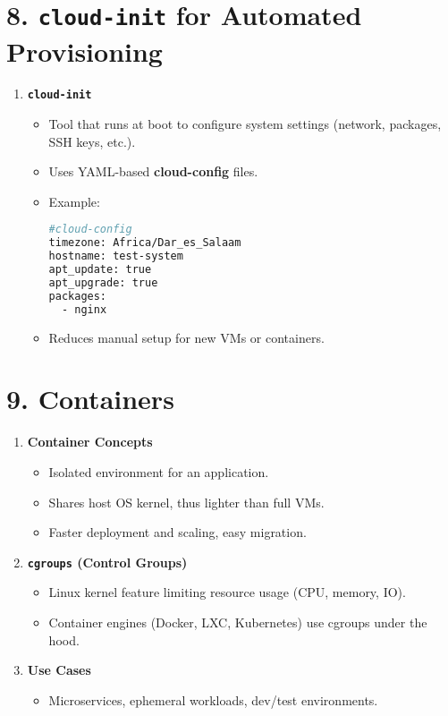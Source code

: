 \documentclass[12pt,a4paper]{report}
\begin{document}
\section*{8. \texttt{cloud-init} for Automated Provisioning}

\begin{enumerate}
    \item \textbf{\texttt{cloud-init}}
    \begin{itemize}
        \item Tool that runs at boot to configure system settings (network, packages, SSH keys, etc.).
        \item Uses YAML-based \textbf{cloud-config} files.
        \item Example:
        \begin{lstlisting}[language=bash]
#cloud-config
timezone: Africa/Dar_es_Salaam
hostname: test-system
apt_update: true
apt_upgrade: true
packages:
  - nginx
        \end{lstlisting}
        \item Reduces manual setup for new VMs or containers.
    \end{itemize}
\end{enumerate}

\section*{9. Containers}

\begin{enumerate}
    \item \textbf{Container Concepts}
    \begin{itemize}
        \item Isolated environment for an application.
        \item Shares host OS kernel, thus lighter than full VMs.
        \item Faster deployment and scaling, easy migration.
    \end{itemize}

    \item \textbf{\texttt{cgroups} (Control Groups)}
    \begin{itemize}
        \item Linux kernel feature limiting resource usage (CPU, memory, IO).
        \item Container engines (Docker, LXC, Kubernetes) use cgroups under the hood.
    \end{itemize}

    \item \textbf{Use Cases}
    \begin{itemize}
        \item Microservices, ephemeral workloads, dev/test environments.
    \end{itemize}
\end{enumerate}
\end{document}
